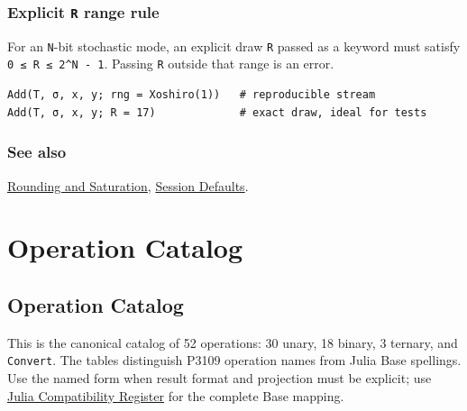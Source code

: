 \subsection{Explicit \texttt{R} range rule}



\label{11101438195765952950}{}


For an \texttt{N}-bit stochastic mode, an explicit draw \texttt{R} passed as a keyword must satisfy \texttt{0 ≤ R ≤ 2{\textasciicircum}N - 1}. Passing \texttt{R} outside that range is an error.




\begin{verbatim}
Add(T, σ, x, y; rng = Xoshiro(1))   # reproducible stream
Add(T, σ, x, y; R = 17)             # exact draw, ideal for tests
\end{verbatim}



\subsection{See also}



\label{292862844209942199-dup11}{}


\href{concept\_\allowbreak{}rounding\_\allowbreak{}saturation.md}{Rounding and Saturation}, \href{reference\_\allowbreak{}defaults\_\allowbreak{}random\_\allowbreak{}display.md}{Session Defaults}.



\chapter{Operation Catalog}


\section{Operation Catalog}



\label{14958459449732521328}{}


This is the canonical catalog of 52 operations: 30 unary, 18 binary, 3 ternary, and \texttt{Convert}. The tables distinguish P3109 operation names from Julia Base spellings. Use the named form when result format and projection must be explicit; use \href{reference\_\allowbreak{}julia\_\allowbreak{}compat.md}{Julia Compatibility Register} for the complete Base mapping.




